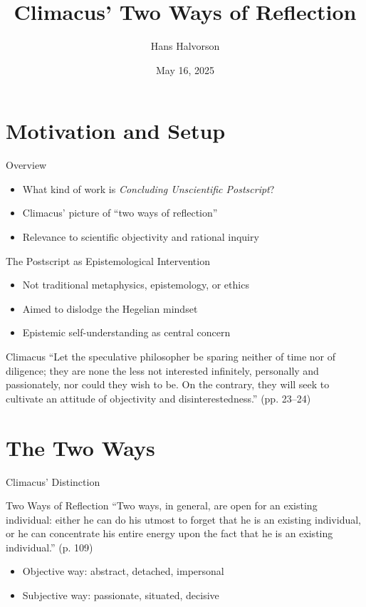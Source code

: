 \documentclass[12pt]{beamer}
\title{Climacus' Two Ways of Reflection}
\author{Hans Halvorson}
\date{May 16, 2025}
\begin{document}
\maketitle

\section{Motivation and Setup}

\begin{frame}{Overview}
\begin{itemize}
  \item What kind of work is \emph{Concluding Unscientific Postscript}?
  \item Climacus’ picture of “two ways of reflection”
  \item Relevance to scientific objectivity and rational inquiry
\end{itemize}
\end{frame}

\begin{frame}{The Postscript as Epistemological Intervention}
\begin{itemize}
  \item Not traditional metaphysics, epistemology, or ethics
  \item Aimed to dislodge the Hegelian mindset
  \item Epistemic self-understanding as central concern
\end{itemize}
\begin{block}{Climacus}
  ``Let the speculative philosopher be sparing neither of time nor of
  diligence; they are none the less not interested infinitely,
  personally and passionately, nor could they wish to be. On the
  contrary, they will seek to cultivate an attitude of objectivity and
  disinterestedness.” (pp. 23--24)
\end{block}
\end{frame}

\section{The Two Ways}

\begin{frame}{Climacus’ Distinction}
\begin{block}{Two Ways of Reflection}
“Two ways, in general, are open for an existing individual: either he can do his utmost to forget that he is an existing individual, or he can concentrate his entire energy upon the fact that he is an existing individual.” (p. 109)
\end{block}
\begin{itemize}
  \item Objective way: abstract, detached, impersonal
  \item Subjective way: passionate, situated, decisive
\end{itemize}
\end{frame}
\end{document}
